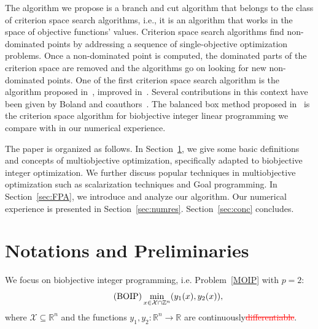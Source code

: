 \documentclass[preprint,12pt]{elsarticle}
\newcommand{\red}[1]{\textcolor{red}{#1}}
\def\R{\mathbb{R}}
\def\Z{\mathbb{Z}}
\begin{document}
The algorithm we propose is a branch and cut algorithm that belongs to the class of criterion space search algorithms, i.e., it is an algorithm that works in the space of
objective functions' values. Criterion space search algorithms find non-dominated points by addressing a sequence of single-objective optimization problems.
Once a non-dominated point is computed, the dominated parts of the criterion space are removed and the algorithms go on looking for
new non-dominated points. One of the first criterion space search algorithm is the algorithm proposed in~\cite{sylva2004method}, improved in~\cite{kirlik2014new, lokman2013finding}.
Several contributions in this context have been given by Boland and coauthors~\cite{boland2015criterion, boland2016shape, boland2017new, 3obj:boland2017quadrant}.
The balanced box method proposed in~\cite{boland2015criterion} is the criterion space algorithm for biobjective integer linear programming we
compare with in our numerical experience.

%
%

The paper is organized as follows. In Section~\ref{sec:notations}, we give some basic definitions and concepts of multiobjective optimization,
specifically adapted to biobjective integer optimization. We further discuss popular techniques
in multiobjective optimization such as scalarization techniques and Goal programming. In Section~\ref{sec:FPA}, we introduce and analyze our algorithm.
Our numerical experience is presented in Section~\ref{sec:numres}.
Section~\ref{sec:conc} concludes.


\section{Notations and Preliminaries}\label{sec:notations}
We focus on biobjective integer programming, i.e. Problem~\eqref{MOIP} with $p=2$:
\begin{equation}\label{BOIP}\tag{\textnormal{BOIP}}
 \min_{x\in \mathcal{X}\cap \Z^n} (y_1(x), y_2(x)),
\end{equation}
where  $\mathcal{X} \subseteq \R^n$  and the functions $y_1,y_2: \R^n\rightarrow \R$ are continuously\red{\st{differentiable}}.
\end{document}
